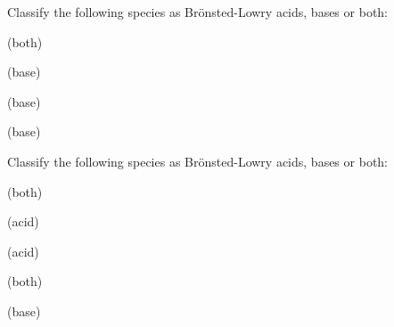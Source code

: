 \documentclass[main.tex]{subfiles}
\begin{document}
\begin{multicols*}{2}
\begin{question}[ID=\the\value{numA}]
Classify the following species as Br\"{o}nsted-Lowry acids, bases or both:
\begin{inparaenum}[(a)]
\item {} %
\item {} %
\item {} %
\item {} %
 \end{inparaenum}
\end{question}
\begin{solution}
\begin{inparaenum}[(a)]
\item {}   (both)
\item {}   (base)
\item {}   (base)
\item {}   (base)
\end{inparaenum}
\hspace{0.1cm}\end{solution}%

\begin{question}[ID=\the\value{numA}]
Classify the following species as Br\"{o}nsted-Lowry acids, bases or both:
\begin{inparaenum}[(a)]
\item {} %
\item {} %
\item {} %
\item {} %
\item {} %
 \end{inparaenum}
\end{question}
\begin{solution}
\begin{inparaenum}[(a)]
\item {}   (both)
\item {}   (acid)
\item {}   (acid)
\item {}   (both)
\item {}   (base)
\end{inparaenum}
\hspace{0.1cm}\end{solution}%


\end{multicols*}
\end{document}
